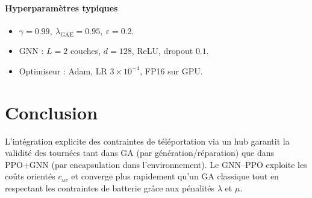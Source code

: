 \documentclass[11pt,a4paper]{article}
\begin{document}
\paragraph{Hyperparamètres typiques}
\begin{itemize}
  \item \(\gamma=0.99,\ \lambda_{\text{GAE}}=0.95,\ \varepsilon=0.2\).
  \item GNN : \(L=2\) couches, \(d=128\), ReLU, dropout \(0.1\).
  \item Optimiseur : Adam, LR \(3\times10^{-4}\), FP16 sur GPU.
\end{itemize}

\section{Conclusion}
L'intégration explicite des contraintes de téléportation via un hub garantit la validité des tournées tant dans GA (par génération/réparation) que dans PPO+GNN (par encapsulation dans l'environnement). Le GNN–PPO exploite les coûts orientés \(c_{uv}\) et converge plus rapidement qu'un GA classique tout en respectant les contraintes de batterie grâce aux pénalités \(\lambda\) et \(\mu\).
\end{document}
